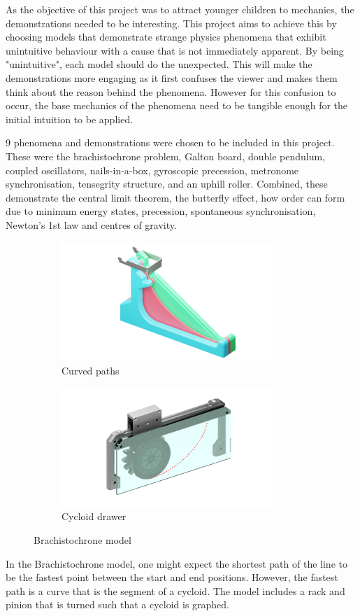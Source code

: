\documentclass[12pt, a4paper]{article}
\begin{document}
As the objective of this project was to attract younger children to mechanics, the demonstrations needed to be interesting. This project aims to achieve this by choosing models that demonstrate strange physics phenomena that exhibit unintuitive behaviour with a cause that is not immediately apparent. By being "unintuitive", each model should do the unexpected. This will make the demonstrations more engaging as it first confuses the viewer and makes them think about the reason behind the phenomena. However for this confusion to occur, the base mechanics of the phenomena need to be tangible enough for the initial intuition to be applied.

9 phenomena and demonstrations were chosen to be included in this project. These were the brachistochrone problem, Galton board, double pendulum, coupled oscillators, nails-in-a-box, gyroscopic precession, metronome synchronisation, tensegrity structure, and an uphill roller. Combined, these demonstrate the central limit theorem, the butterfly effect, how order can form due to minimum energy states, precession, spontaneous synchronisation, Newton's 1st law and centres of gravity.

\begin{figure}[H]
    \centering
    \begin{subfigure}{.5\textwidth}
        \centering
        \includegraphics[width=8cm]{BR-render-1.png}
        \caption{Curved paths}
        \label{}
    \end{subfigure}%
    \begin{subfigure}{.5\textwidth}
        \centering
        \includegraphics[width=8cm]{BR-render-2.png}
        \caption{Cycloid drawer}
        \label{}
    \end{subfigure}
    \caption{Brachistochrone model}
    \label{brachistochrone}
\end{figure}
In the Brachistochrone model, one might expect the shortest path of the line to be the fastest point between the start and end positions. However, the fastest path is a curve that is the segment of a cycloid. The model includes a rack and pinion that is turned such that a cycloid is graphed.
\end{document}
